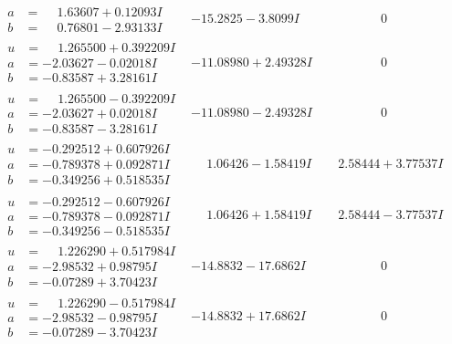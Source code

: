 \documentclass[1p]{elsarticle_modified}
\theoremstyle{definition}
\begin{document}
$$\begin{array}{c|c|c}
\begin{aligned}
a &= \phantom{-}1.63607 + 0.12093 I \\
b &= \phantom{-}0.76801 - 2.93133 I\end{aligned}
 & -15.2825 - 3.8099 I & \phantom{-0.000000 } 0 \\ \hline\begin{aligned}
u &= \phantom{-}1.265500 + 0.392209 I \\
a &= -2.03627 - 0.02018 I \\
b &= -0.83587 + 3.28161 I\end{aligned}
 & -11.08980 + 2.49328 I & \phantom{-0.000000 } 0 \\ \hline\begin{aligned}
u &= \phantom{-}1.265500 - 0.392209 I \\
a &= -2.03627 + 0.02018 I \\
b &= -0.83587 - 3.28161 I\end{aligned}
 & -11.08980 - 2.49328 I & \phantom{-0.000000 } 0 \\ \hline\begin{aligned}
u &= -0.292512 + 0.607926 I \\
a &= -0.789378 + 0.092871 I \\
b &= -0.349256 + 0.518535 I\end{aligned}
 & \phantom{-}1.06426 - 1.58419 I & \phantom{-}2.58444 + 3.77537 I \\ \hline\begin{aligned}
u &= -0.292512 - 0.607926 I \\
a &= -0.789378 - 0.092871 I \\
b &= -0.349256 - 0.518535 I\end{aligned}
 & \phantom{-}1.06426 + 1.58419 I & \phantom{-}2.58444 - 3.77537 I \\ \hline\begin{aligned}
u &= \phantom{-}1.226290 + 0.517984 I \\
a &= -2.98532 + 0.98795 I \\
b &= -0.07289 + 3.70423 I\end{aligned}
 & -14.8832 - 17.6862 I & \phantom{-0.000000 } 0 \\ \hline\begin{aligned}
u &= \phantom{-}1.226290 - 0.517984 I \\
a &= -2.98532 - 0.98795 I \\
b &= -0.07289 - 3.70423 I\end{aligned}
 & -14.8832 + 17.6862 I & \phantom{-0.000000 } 0 \\ \hline\begin{aligned}

\end{aligned}
\end{array}$$
\end{document}
